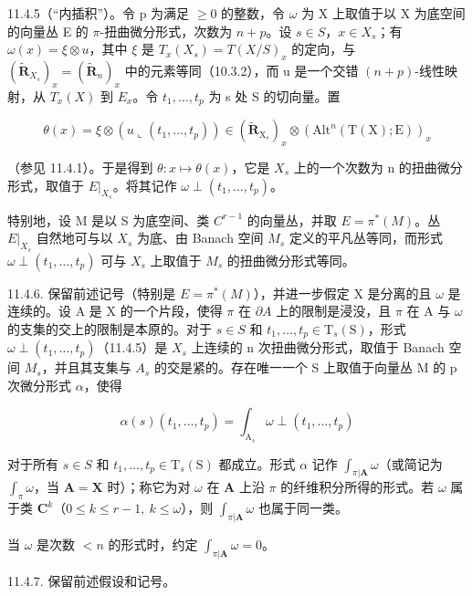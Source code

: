 11.4.5（“内插积”）。令 p 为满足 \(\geqslant 0\) 的整数，令 \(\omega\) 为 X 上取值于以 X 为底空间的向量丛 E 的 \(\pi\)-扭曲微分形式，次数为 \(n + p\)。设 \(s \in S\)，\(x \in X_s\)；有 \(\omega(x) = \xi \otimes u\)，其中 \(\xi\) 是 \(T_x(X_s) = T(X/S)_x\) 的定向，与 \((\tilde{\mathbf{R}}_{X_s})_x = (\tilde{\mathbf{R}}_n)_x\) 中的元素等同（10.3.2），而 u 是一个交错 \((n + p)\)-线性映射，从 \(T_x(X)\) 到 \(E_x\)。令 \(t_1, \ldots, t_p\) 为 s 处 S 的切向量。置

\[
\theta (x) = \xi \otimes (u \llcorner (t _ {1}, \dots , t _ {p})) \in (\tilde {\mathbf {R}} _ {\mathrm{X} _ {s}}) _ {x} \otimes (\mathrm{Alt} ^ {n} (\mathrm{T} (\mathrm{X}); \mathrm{E})) _ {x}
\]

（参见 11.4.1）。于是得到 \(\theta: x \mapsto \theta(x)\)，它是 \(X_s\) 上的一个次数为 n 的扭曲微分形式，取值于 \(E|_{X_{s}}\)。将其记作 \(\omega \perp (t_1, \ldots, t_p)\)。

特别地，设 M 是以 S 为底空间、类 \(C^{r-1}\) 的向量丛，并取 \(E = \pi^{*}(M)\)。丛 \(E|_{X_{s}}\) 自然地可与以 \(X_{s}\) 为底、由 Banach 空间 \(M_{s}\) 定义的平凡丛等同，而形式 \(\omega\perp(t_{1},\ldots,t_{p})\) 可与 \(X_{s}\) 上取值于 \(M_{s}\) 的扭曲微分形式等同。

11.4.6. 保留前述记号（特别是 \(E=\pi^{*}(M)\)），并进一步假定 X 是分离的且 \(\omega\) 是连续的。设 A 是 X 的一个片段，使得 \(\pi\) 在 \(\partial A\) 上的限制是浸没，且 \(\pi\) 在 A 与 \(\omega\) 的支集的交上的限制是本原的。对于 \(s \in S\) 和 \(t_{1},\ldots,t_{p}\in\mathrm{T}_{s}(\mathrm{S})\)，形式 \(\omega \perp (t_{1}, \ldots, t_{p})\)（11.4.5）是 \(X_{s}\) 上连续的 n 次扭曲微分形式，取值于 Banach 空间 \(M_{s}\)，并且其支集与 \(A_{s}\) 的交是紧的。存在唯一一个 S 上取值于向量丛 M 的 p 次微分形式 \(\alpha\)，使得

\[
\alpha (s) \left(t _ {1}, \dots , t _ {p}\right) = \int_ {\mathrm{A} _ {s}} \omega \perp \left(t _ {1}, \dots , t _ {p}\right)
\]

对于所有 \(s \in S\) 和 \(t_{1},\ldots,t_{p}\in\mathrm{T}_{s}(\mathrm{S})\) 都成立。形式 \(\alpha\) 记作 \(\int_{\pi|\mathbf{A}} \omega\)（或简记为 \(\int_{\pi} \omega\)，当 \(\mathbf{A} = \mathbf{X}\) 时）；称它为对 \(\omega\) 在 \(\mathbf{A}\) 上沿 \(\pi\) 的纤维积分所得的形式。若 \(\omega\) 属于类 \(\mathbf{C}^{k}\)（\(0\leqslant k\leqslant r-1,\ k\leqslant\omega\)），则 \(\int_{\pi|\mathbf{A}} \omega\) 也属于同一类。

当 \(\omega\) 是次数 \(< n\) 的形式时，约定 \(\int_{\pi|\mathbf{A}} \omega = 0\)。

11.4.7. 保留前述假设和记号。

